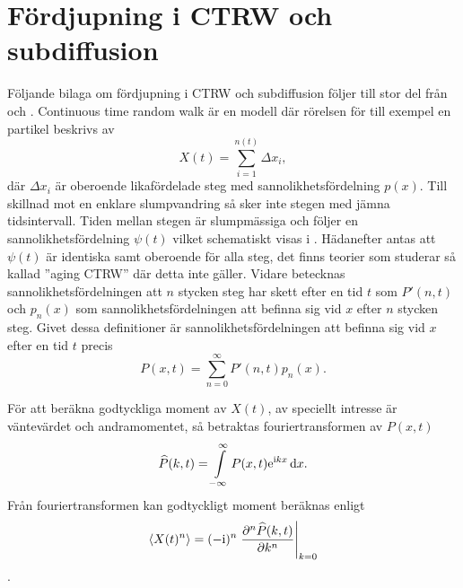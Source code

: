 \newcommand{\Pk}{\widehat{P}}
\newcommand{\Pks}{\widetilde{\widehat{P}}}
\newcommand{\pk}{\hat{p}}
\newcommand{\PPs}{\widetilde{P'}}
\newcommand{\psis}{\widetilde{\psi}}
\newcommand{\PSIs}{\widetilde{\Psi}}

\newcommand{\Xs}{\widetilde{X}(s)}

\chapter{Fördjupning i CTRW och subdiffusion}


\label{app:CTRW} 
Följande bilaga om fördjupning i CTRW och subdiffusion  följer till stor del från \cite{Chu_2003} och \cite{Vahey_2006}. Continuous time random walk är en modell där rörelsen för till exempel en partikel beskrivs av 
\begin{equation}
    X(t) = \sum_{i=1}^{n(t)} \Delta x_i,
\end{equation}
där $\Delta x_i$ är oberoende likafördelade steg med sannolikhetsfördelning $p(x)$. Till skillnad mot en enklare slumpvandring så sker inte stegen med jämna tidsintervall. Tiden mellan stegen är slumpmässiga och följer en sannolikhetsfördelning $\psi (t)$ vilket schematiskt visas i . Hädanefter antas att $\psi(t)$ är identiska samt oberoende för alla steg, det finns teorier som studerar så kallad ''aging CTRW''\cite{Barkai_ACTRW2002} där detta inte gäller. Vidare betecknas sannolikhetsfördelningen att $n$ stycken steg har skett efter en tid $t$ som $P'(n,t)$ och $p_n(x)$ som sannolikhetsfördelningen att befinna sig vid $x$ efter $n$ stycken steg. Givet dessa definitioner är sannolikhetsfördelningen att befinna sig vid $x$ efter en tid $t$ precis 
\begin{equation}
\label{eq:P(x,t)}
    P(x,t) =\sum_{n=0}^{\infty} P'(n,t)p_n(x).
\end{equation}

För att beräkna godtyckliga moment av $X(t)$, av speciellt intresse är väntevärdet och andramomentet, så betraktas fouriertransformen av $P(x,t)$
\begin{equation}\label{eq:four}
\Pk (k,t) = \int_{-\infty}^{\infty} P(x,t)\ee^{\ii kx}\id{x}.
\end{equation}
Från fouriertransformen kan godtyckligt moment beräknas enligt 
\begin{equation}\label{eq:moment}
\ev{X(t)^n} = (-\ii)^n \eval{\frac{\pd^n \Pk (k,t)}{\pd k^n}}_{k=0}
\end{equation}. 

